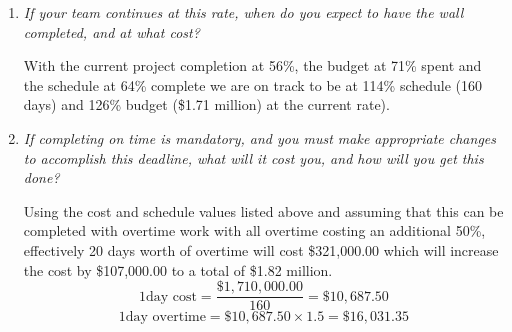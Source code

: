 \documentclass[letterpaper,10pt]{article}
\begin{document}
\begin{enumerate}
\item\emph{If your team continues at this rate, when do you expect to have the wall completed, and at what cost?}
\par With the current project completion at 56\%, the budget at 71\% spent and the schedule at 64\% complete we are on track to be at 114\% schedule (160 days) and 126\% budget (\$1.71 million) at the current rate).

\item\emph{If completing on time is mandatory, and you must make appropriate changes to accomplish this deadline, what will it cost you, and how will you get this done?}
\par Using the cost and schedule values listed above and assuming that this can be completed with overtime work with all overtime costing an additional 50\%, effectively 20 days worth of overtime will cost \$321,000.00 which will increase the cost by \$107,000.00 to a total of \$1.82 million.
\[1 \mbox{day cost} = \frac{\$1,710,000.00}{160} = \$10,687.50\]
\[1 \mbox{day overtime} = \$10,687.50\times 1.5= \$16,031.35\]
\end{enumerate}
\end{document}
